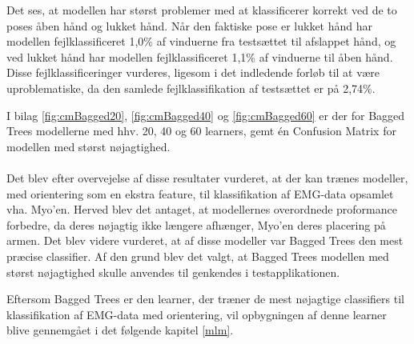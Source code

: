 Det ses, at modellen har størst problemer med at klassificerer korrekt ved de to poses åben hånd og lukket hånd. Når den faktiske pose er lukket hånd har modellen fejlklassificeret 1,0\% af vinduerne fra testsættet til afslappet hånd, og ved lukket hånd har modellen fejlklassificeret 1,1\% af vinduerne til åben hånd. 
Disse fejlklassificeringer vurderes, ligesom i det indledende forløb til at være uproblematiske, da den samlede fejlklassifikation af testsættet er på 2,74\%. 

I bilag \ref{fig:cmBagged20}, \ref{fig:cmBagged40} og \ref{fig:cmBagged60} er der for Bagged Trees modellerne med hhv. 20, 40 og 60 learners, gemt én Confusion Matrix for modellen med størst nøjagtighed.\\\\
Det blev efter overvejelse af disse resultater vurderet, at der kan trænes modeller, med orientering som en ekstra feature, til klassifikation af EMG-data opsamlet vha. Myo'en. Herved blev det antaget, at modellernes overordnede proformance forbedre, da deres nøjagtig ikke længere afhænger, Myo'en deres placering på armen. Det blev videre vurderet, at af disse modeller var Bagged Trees den mest præcise classifier. Af den grund blev det valgt, at Bagged Trees modellen med størst nøjagtighed skulle anvendes til genkendes i testapplikationen. 

Eftersom Bagged Trees er den learner, der træner de mest nøjagtige classifiers til klassifikation af EMG-data med orientering, vil opbygningen af denne learner blive gennemgået i det følgende kapitel \ref{mlm}.
 